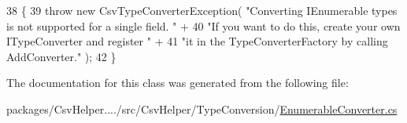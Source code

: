 \begin{DoxyCode}
38         \{
39             \textcolor{keywordflow}{throw} \textcolor{keyword}{new} CsvTypeConverterException( \textcolor{stringliteral}{"Converting IEnumerable types is not supported for a
       single field. "} +
40                                                  \textcolor{stringliteral}{"If you want to do this, create your own ITypeConverter
       and register "} +
41                                                  \textcolor{stringliteral}{"it in the TypeConverterFactory by calling AddConverter."} 
      );
42         \}
\end{DoxyCode}


The documentation for this class was generated from the following file\-:\begin{DoxyCompactItemize}
\item 
packages/\-Csv\-Helper..../src/\-Csv\-Helper/\-Type\-Conversion/\hyperlink{a00230}{Enumerable\-Converter.\-cs}\end{DoxyCompactItemize}

